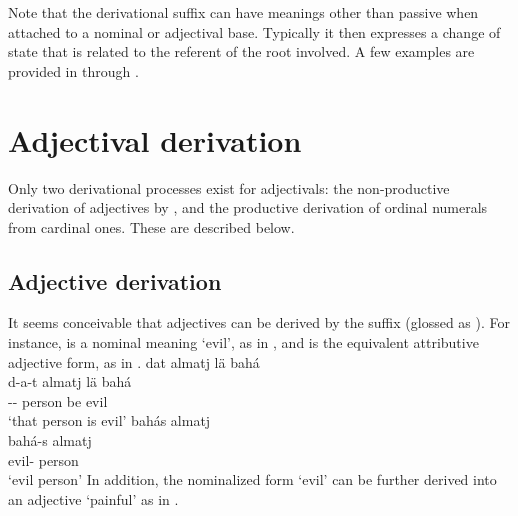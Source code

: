 Note that the derivational suffix  can have meanings other than passive when attached to a nominal or adjectival base. Typically it then expresses a change of state that is related to the referent of the root involved. A few examples are provided in  through . 
\ea\label{vblzDUVVex5}
\z
\ea\label{vblzDUVVex6}
\z
\ea\label{vblzDUVVex7}
\z
\ea\label{vblzDUVVex8}
\z



\section{Adjectival derivation}\label{adjDerivation}
Only two derivational processes exist for adjectivals: the non-productive derivation of adjectives by , and the productive derivation of ordinal numerals from cardinal ones. 
These are described below. 

\subsection{Adjective derivation}\label{ATTRadjDerivation}
It seems conceivable that adjectives can be derived by the suffix \mbox{} (glossed as ). 
For instance,  is a nominal meaning ‘evil’, as in , and  is the equivalent attributive adjective form, as in . 
\ea\label{derivADJex1}
\glll	dat almatj lä bahá\\
	d-a-t almatj lä bahá\\
	-- person\BS{} be\BS{} evil\BS{} \\\nopagebreak
\trans	‘that person is evil’	
\z
\ea\label{derivADJex2}
\glll	bahás almatj\\
	bahá-s almatj\\
	evil- person\BS{}\\\nopagebreak
\trans	‘evil person’	
\z
In addition, the nominalized form  ‘evil’ can be further derived into an adjective  ‘painful’ as in . %
\ea\label{derivADJex3}
\z

